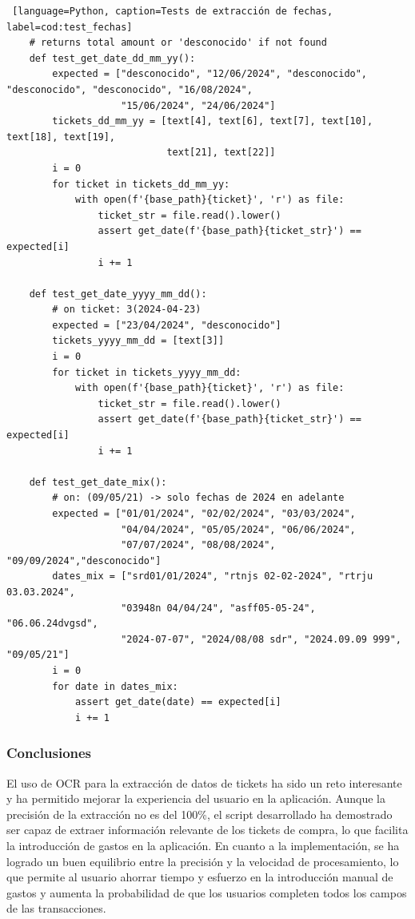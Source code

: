 \begin{lstlisting} [language=Python, caption=Tests de extracción de fechas, label=cod:test_fechas]
    # returns total amount or 'desconocido' if not found
    def test_get_date_dd_mm_yy():
        expected = ["desconocido", "12/06/2024", "desconocido", "desconocido", "desconocido", "16/08/2024",
                    "15/06/2024", "24/06/2024"]
        tickets_dd_mm_yy = [text[4], text[6], text[7], text[10], text[18], text[19],
                            text[21], text[22]]
        i = 0
        for ticket in tickets_dd_mm_yy:
            with open(f'{base_path}{ticket}', 'r') as file:
                ticket_str = file.read().lower()
                assert get_date(f'{base_path}{ticket_str}') == expected[i]
                i += 1

    def test_get_date_yyyy_mm_dd():
        # on ticket: 3(2024-04-23)
        expected = ["23/04/2024", "desconocido"]
        tickets_yyyy_mm_dd = [text[3]]
        i = 0
        for ticket in tickets_yyyy_mm_dd:
            with open(f'{base_path}{ticket}', 'r') as file:
                ticket_str = file.read().lower()
                assert get_date(f'{base_path}{ticket_str}') == expected[i]
                i += 1

    def test_get_date_mix():
        # on: (09/05/21) -> solo fechas de 2024 en adelante
        expected = ["01/01/2024", "02/02/2024", "03/03/2024", 
                    "04/04/2024", "05/05/2024", "06/06/2024", 
                    "07/07/2024", "08/08/2024", "09/09/2024","desconocido"]
        dates_mix = ["srd01/01/2024", "rtnjs 02-02-2024", "rtrju 03.03.2024", 
                    "03948n 04/04/24", "asff05-05-24", "06.06.24dvgsd", 
                    "2024-07-07", "2024/08/08 sdr", "2024.09.09 999", "09/05/21"]
        i = 0
        for date in dates_mix:
            assert get_date(date) == expected[i]
            i += 1
\end{lstlisting}

\subsubsection{Conclusiones}
El uso de OCR para la extracción de datos de tickets ha sido un reto interesante y ha permitido mejorar la experiencia del usuario en la aplicación. Aunque la precisión de la extracción no es del 100\%, el script desarrollado ha demostrado ser capaz de extraer información relevante de los tickets de compra, lo que facilita la introducción de gastos en la aplicación. En cuanto a la implementación, se ha logrado un buen equilibrio entre la precisión y la velocidad de procesamiento, lo que permite al usuario ahorrar tiempo y esfuerzo en la introducción manual de gastos y aumenta la probabilidad de que los usuarios completen todos los campos de las transacciones.

